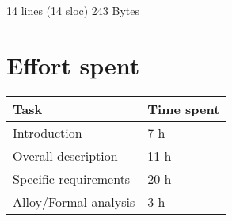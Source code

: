 14 lines (14 sloc)  243 Bytes

\chapter{Effort spent}
\begin{tabular}{|l|l|}
	\hline
	Task & Time spent\\
	\hline
	Introduction & 7 h\\
	\hline
	Overall description & 11 h\\
	\hline
	Specific requirements & 20 h\\
	\hline
	Alloy/Formal analysis & 3 h\\
	\hline
\end{tabular}